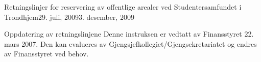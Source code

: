 \begin{instruks}{Retningslinjer for reservering av offentlige arealer
    ved Studentersamfundet i Trondhjem}{29. juli, 2009}{3. desember, 2009}
    \begin{instruksledd}{Oppdatering av retningslinjene}
        Denne instruksen er vedtatt av Finansstyret 22. mars 2007. Den kan evalueres
        av Gjengsjefkollegiet/Gjengsekretariatet og endres av Finansstyret ved behov.
    \end{instruksledd}

\end{instruks}


